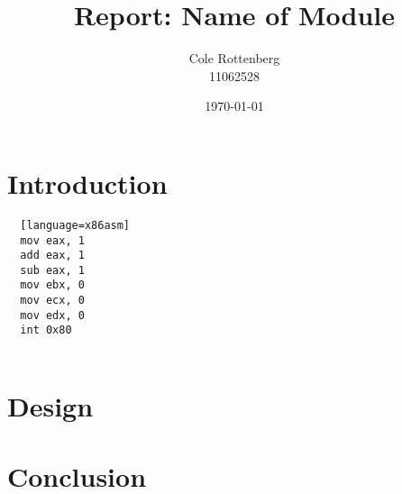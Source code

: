 \documentclass{article}
\title{Report: Name of Module}
\author{Cole Rottenberg \\ 11062528}
\date{\today}
\begin{document}
\maketitle

\section*{Introduction}

\begin{lstlisting}
  [language=x86asm]
  mov eax, 1
  add eax, 1
  sub eax, 1
  mov ebx, 0
  mov ecx, 0
  mov edx, 0
  int 0x80
  
\end{lstlisting}

\section*{Design}


\section*{Conclusion}
\end{document}
